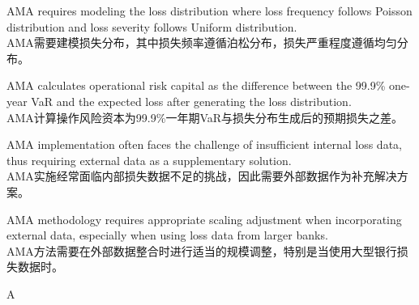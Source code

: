 \documentclass{article}
\begin{document}
        \begin{choices}
            \item AMA requires modeling the loss distribution where loss frequency follows Poisson distribution and loss severity follows Uniform distribution.
            \\AMA需要建模损失分布，其中损失频率遵循泊松分布，损失严重程度遵循均匀分布。
            \item AMA calculates operational risk capital as the difference between the 99.9\% one-year VaR and the expected loss after generating the loss distribution.
            \\AMA计算操作风险资本为99.9\%一年期VaR与损失分布生成后的预期损失之差。
            \item AMA implementation often faces the challenge of insufficient internal loss data, thus requiring external data as a supplementary solution.
            \\AMA实施经常面临内部损失数据不足的挑战，因此需要外部数据作为补充解决方案。
            \item AMA methodology requires appropriate scaling adjustment when incorporating external data, especially when using loss data from larger banks.
            \\AMA方法需要在外部数据整合时进行适当的规模调整，特别是当使用大型银行损失数据时。
        \end{choices}
        
        \begin{correctanswer}
        A
        \end{correctanswer}
        
\end{document}
